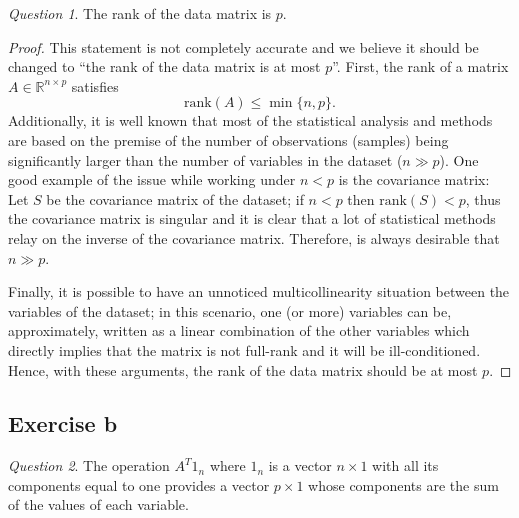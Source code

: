 \documentclass[11pt]{article}
\theoremstyle{definition}
\theoremstyle{remark}
\theoremstyle{remark}
\theoremstyle{remark}
\newtheorem*{question}{Question}
\theoremstyle{proof}
\begin{document}
\begin{question}
  The rank of the data matrix is $p$.
\end{question}
\begin{proof}
  This statement is not completely accurate and we believe it should be changed
  to ``the rank of the data matrix is at most $p$''. First, the rank of a matrix
  $A\in\mathbb{R}^{n\times p}$ satisfies
  \[
    \mathrm{rank}(A)\leq \min\{n, p\}.
  \]
  Additionally, it is well known that most of the statistical analysis and
  methods are based on the premise of the number of observations (samples) being
  significantly larger than the number of variables in the dataset ($n\gg p$).
  One good example of the issue while working under $n<p$ is the covariance
  matrix: Let $S$ be the covariance matrix of the dataset; if $n<p$ then
  $\mathrm{rank}(S)<p$, thus the covariance matrix is singular and it is clear
  that a lot of statistical methods relay on the inverse of the covariance
  matrix. Therefore, is always desirable that $n\gg p$.

  Finally, it is possible to have an unnoticed multicollinearity situation
  between the variables of the dataset; in this scenario, one (or more)
  variables can be, approximately, written as a linear combination of the other
  variables which directly implies that the matrix is not full-rank and it will
  be ill-conditioned. Hence, with these arguments, the rank of the data matrix
  should be at most $p$.
\end{proof}


\subsection*{Exercise b}
\begin{question}
  The operation $A^{T}1_{n}$ where $1_{n}$ is a vector $n \times 1$ with all its
  components equal to one provides a vector $p \times 1$ whose components are
  the sum of the values of each variable.
\end{question}
\end{document}
